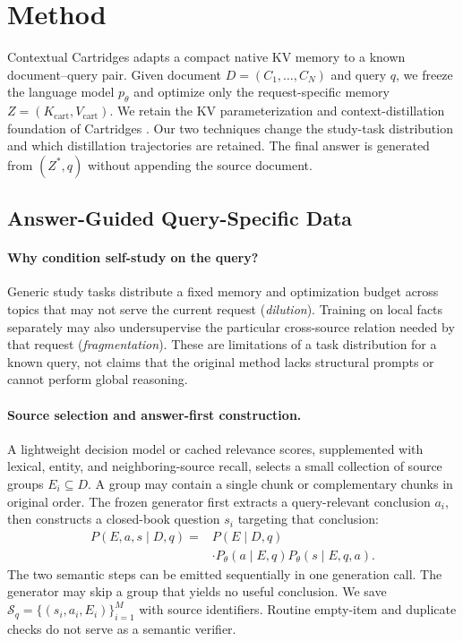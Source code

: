 \section{Method}
\label{sec:method}

Contextual Cartridges adapts a compact native KV memory to a known document--query pair. Given document $D=(C_1,\ldots,C_N)$ and query $q$, we freeze the language model $p_\theta$ and optimize only the request-specific memory $Z=(K_{\mathrm{cart}},V_{\mathrm{cart}})$. We retain the KV parameterization and context-distillation foundation of Cartridges \citep{eyuboglu2025cartridges}. Our two techniques change the study-task distribution and which distillation trajectories are retained. The final answer is generated from $(Z^*,q)$ without appending the source document.

\subsection{Answer-Guided Query-Specific Data}

\paragraph{Why condition self-study on the query?}
Generic study tasks distribute a fixed memory and optimization budget across topics that may not serve the current request (\emph{dilution}). Training on local facts separately may also undersupervise the particular cross-source relation needed by that request (\emph{fragmentation}). These are limitations of a task distribution for a known query, not claims that the original method lacks structural prompts or cannot perform global reasoning.

\paragraph{Source selection and answer-first construction.}
A lightweight decision model or cached relevance scores, supplemented with lexical, entity, and neighboring-source recall, selects a small collection of source groups $E_i\subseteq D$. A group may contain a single chunk or complementary chunks in original order. The frozen generator first extracts a query-relevant conclusion $a_i$, then constructs a closed-book question $s_i$ targeting that conclusion:
\begin{align}
P(E,a,s\mid D,q)={}&P(E\mid D,q)\nonumber\\
&\cdot P_\theta(a\mid E,q)P_\theta(s\mid E,q,a).
\end{align}
The two semantic steps can be emitted sequentially in one generation call. The generator may skip a group that yields no useful conclusion. We save $\mathcal S_q=\{(s_i,a_i,E_i)\}_{i=1}^M$ with source identifiers. Routine empty-item and duplicate checks do not serve as a semantic verifier.


